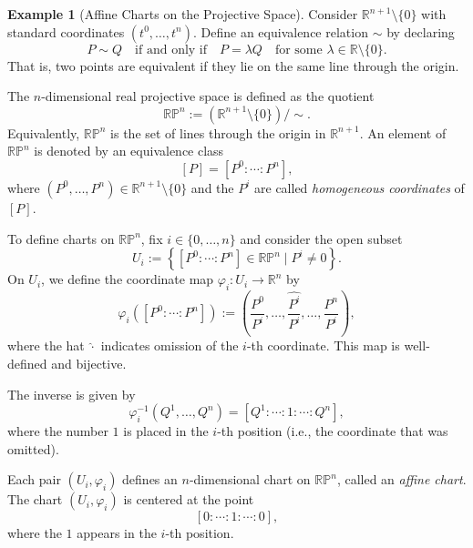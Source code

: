 \documentclass[12pt]{article}
\theoremstyle{definition}
\newtheorem{example}{Example}[section]
\begin{document}
\medskip
\begin{example}[Affine Charts on the Projective Space]
Consider $\mathbb{R}^{n+1} \setminus \{0\}$ with standard coordinates $(t^0, \ldots, t^n)$. Define an equivalence relation $\sim$ by declaring
\[
P \sim Q \quad \text{if and only if} \quad P = \lambda Q \quad \text{for some } \lambda \in \mathbb{R} \setminus \{0\}.
\]
That is, two points are equivalent if they lie on the same line through the origin.

The $n$-dimensional real projective space is defined as the quotient
\[
\mathbb{RP}^n := \left(\mathbb{R}^{n+1} \setminus \{0\} \right) \big/ \sim.
\]
Equivalently, $\mathbb{RP}^n$ is the set of lines through the origin in $\mathbb{R}^{n+1}$. An element of $\mathbb{RP}^n$ is denoted by an equivalence class
\[
[P] = [P^0 : \cdots : P^n],
\]
where $(P^0, \ldots, P^n) \in \mathbb{R}^{n+1} \setminus \{0\}$ and the $P^i$ are called \emph{homogeneous coordinates} of $[P]$.

To define charts on $\mathbb{RP}^n$, fix $i \in \{0, \ldots, n\}$ and consider the open subset
\[
U_i := \left\{ [P^0 : \cdots : P^n] \in \mathbb{RP}^n \mid P^i \neq 0 \right\}.
\]
On $U_i$, we define the coordinate map $\varphi_i : U_i \to \mathbb{R}^n$ by
\[
\varphi_i([P^0 : \cdots : P^n]) := \left( \frac{P^0}{P^i}, \ldots, \widehat{\frac{P^i}{P^i}}, \ldots, \frac{P^n}{P^i} \right),
\]
where the hat $\widehat{\cdot}$ indicates omission of the $i$-th coordinate. This map is well-defined and bijective.

The inverse is given by
\[
\varphi_i^{-1}(Q^1, \ldots, Q^n) = [Q^1 : \cdots : 1 : \cdots : Q^n],
\]
where the number $1$ is placed in the $i$-th position (i.e., the coordinate that was omitted).

Each pair $(U_i, \varphi_i)$ defines an $n$-dimensional chart on $\mathbb{RP}^n$, called an \emph{affine chart}. The chart $(U_i, \varphi_i)$ is centered at the point
\[
[0 : \cdots : 1 : \cdots : 0],
\]
where the $1$ appears in the $i$-th position.
\end{example}
\end{document}
